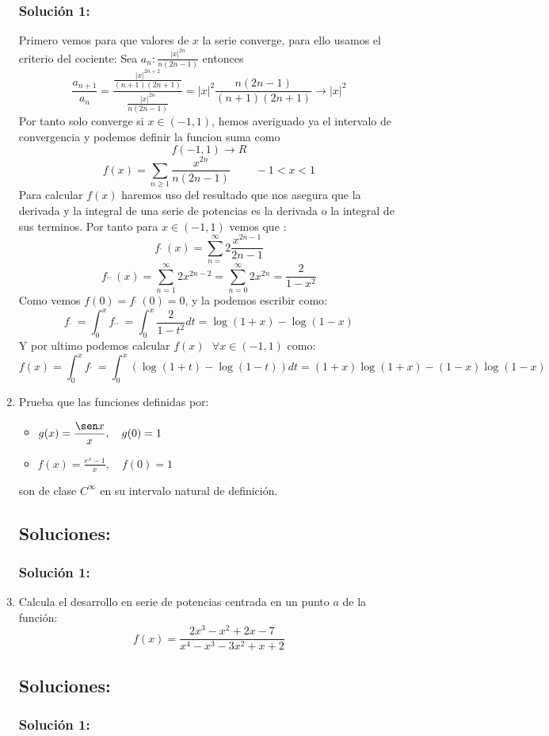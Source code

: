 \documentclass[a4paper, 11pt]{article} %
\begin{document}
\begin{enumerate}
		\subsubsection*{Solución 1:}
	Primero vemos para que valores de $x$ la serie converge, para ello usamos el criterio del cociente:
	Sea $a_n:\frac{\vert x\vert^{2n}}{n(2n-1)}$ entonces $$\frac{a_{n+1}}{a_n}=\frac{\frac{\vert x\vert^{2n+2}}{(n+1)(2n+1)}}{\frac{\vert x\vert^{2n}}{n(2n-1)}}=\vert x\vert^2\frac{n(2n-1)}{(n+1)(2n+1)}\rightarrow \vert x\vert^2$$
	Por tanto solo converge si $x\in (-1,1)$, hemos averiguado ya el intervalo de convergencia y podemos definir la funcion suma como 
	$$f(-1,1) \rightarrow R$$
	$$f(x)=\sum_{n\geq1}\frac{x^{2n}}{n(2n-1)} \ \ \ \ \ \ \ \ \ \ -1<x<1$$
	Para calcular $f(x)$ haremos uso del resultado que nos asegura que la derivada y la integral de una serie de potencias es la derivada o la integral de sus terminos.
	Por tanto para $x\in (-1,1)$ vemos que :
	 $$f\ \acute{}\ (x)=\sum_{n=}^\infty2\frac{x^{2n-1}}{2n-1}$$
	 $$f\ \acute{}\ \acute{}\ (x)=\sum_{n=1}^\infty 2x^{2n-2}=\sum_{n=0}^\infty 2x^{2n}=\frac{2}{1-x^2}$$
	 Como vemos $f(0)=f\ \acute{}\ (0)=0$, y la podemos escribir como:
	 $$f\ \acute{}\ =\int_0^xf\ \acute{}\ \acute{}\ =\int_0^x\frac{2}{1-t^2}dt=\log(1+x)-\log(1-x)$$
	 Y por ultimo podemos calcular $f(x)\ \ \ \forall x \in (-1,1)$ como:
	 $$f(x)=\int_0^xf\ \acute{}\ =\int_0^x(\log(1+t)-\log(1-t))dt=(1+x)\log(1+x)-(1-x)\log(1-x)$$
	 
	\item Prueba que las funciones definidas por:
	\begin{itemize}
		\item $\displaystyle{g(x) = \frac{\sen x}{x}, \quad g(0) = 1}$
		\item $\displaystyle{f(x) = \frac{e^x-1}{x}, \quad f(0) = 1}$
	\end{itemize}
	son de clase $\mathit{C}^\infty$ en su intervalo natural de definición.
	\subsection*{Soluciones:}
		\subsubsection*{Solución 1:}
	
	\item Calcula el desarrollo en serie de potencias centrada en un punto $a$ de la función:
	$$\displaystyle{f(x) = \frac{2x^3-x^2+2x-7}{x^4-x^3-3x^2+x+2}}$$
	\subsection*{Soluciones:}
		\subsubsection*{Solución 1:}
	
\end{enumerate}
\end{document}
